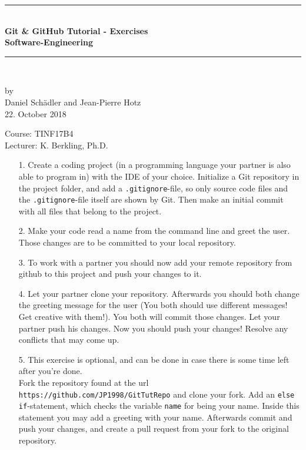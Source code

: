 \documentclass[a4paper, 12pt]{article}
\begin{document}
	
	\begin{center}
		\newcommand{\HRule}{\rule{\linewidth}{0.5mm}}
		\HRule \\[0.8cm]
		{ \huge \bfseries Git \& GitHub Tutorial - Exercises}\\[0.4cm]
		{\LARGE \bfseries Software-Engineering}\\[0.4cm]
		\HRule \\[1.5cm]
		\begin{center}
			by\\[0.2cm]
			Daniel Schädler and Jean-Pierre Hotz\\[0.7cm]
			22. October 2018
		\end{center}
		\vfill
		Course: TINF17B4\\
		Lecturer: K. Berkling, Ph.D.
	\end{center}
	\newpage
	\pagestyle{fancy}
	
	\begin{enumerate}
		\item[1.] Create a coding project (in a programming language your partner is also able to program in) with the IDE of your choice. Initialize a Git repository in the project folder, and add a \lstinline|.gitignore|-file, so only source code files and the \lstinline|.gitignore|-file itself are shown by Git. Then make an initial commit with all files that belong to the project.\\
		\item[2.] Make your code read a name from the command line and greet the user. Those changes are to be committed to your local repository.\\
		\item[3.] To work with a partner you should now add your remote repository from github to this project and push your changes to it.\\
		\item[4.] Let your partner clone your repository. Afterwards you should both change the greeting message for the user (You both should use different messages! Get creative with them!). You both will commit those changes. Let your partner push his changes. Now you should push your changes! Resolve any conflicts that may come up.\\ 
		\item[5.] This exercise is optional, and can be done in case there is some time left after you're done.\\
		Fork the repository found at the url \lstinline|https://github.com/JP1998/GitTutRepo| and clone your fork. Add an \lstinline|else if|-statement, which checks the variable \lstinline|name| for being your name. Inside this statement you may add a greeting with your name. Afterwards commit and push your changes, and create a pull request from your fork to the original repository.
	\end{enumerate}
	
\end{document}
